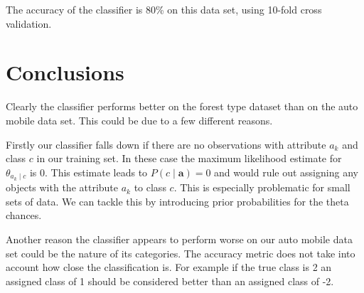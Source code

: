 The accuracy of the classifier is 80\% on this data set, using 10-fold cross validation.

\section{Conclusions}

Clearly the classifier performs better on the forest type dataset than on the auto mobile data set.
This could be due to a few different reasons.

Firstly our classifier falls down if there are no observations with attribute $a_k$ and class $c$ in our training set. In these case the maximum likelihood estimate for $\theta_{a_k \mid c}$ is 0.
This estimate leads to $P(c \mid \mathbf{a}) = 0$ and would rule out assigning any objects with the attribute $a_k$ to class $c$.
This is especially problematic for small sets of data.
We can tackle this by introducing prior probabilities for the theta chances.

Another reason the classifier appears to perform worse on our auto mobile data set could be the nature of its categories.
The accuracy metric does not take into account how close the classification is.
For example if the true class is 2 an assigned class of 1 should be considered better than an assigned class of -2.

